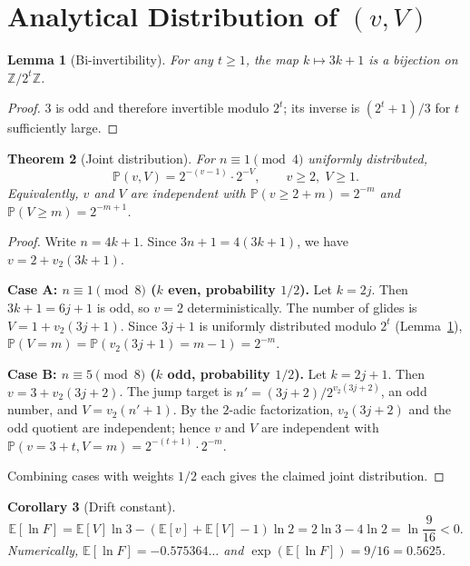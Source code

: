 \documentclass[12pt,a4paper]{article}
\newtheorem{theorem}{Theorem}[section]
\newtheorem{lemma}[theorem]{Lemma}
\newtheorem{corollary}[theorem]{Corollary}
\newcommand{\E}{\mathbb{E}}
\newcommand{\Prob}{\mathbb{P}}
\newcommand{\Z}{\mathbb{Z}}
\begin{document}
\section{Analytical Distribution of $(v,V)$}\label{sec:distribution}

\begin{lemma}[Bi-invertibility]\label{lem:bijection}
For any $t \ge 1$, the map $k \mapsto 3k+1$ is a bijection on $\Z/2^t\Z$.
\end{lemma}

\begin{proof}
$3$ is odd and therefore invertible modulo $2^t$; its inverse is $(2^t+1)/3$ for $t$ sufficiently large.
\end{proof}

\begin{theorem}[Joint distribution]\label{thm:distribution}
For $n \equiv 1 \pmod 4$ uniformly distributed,
\[
\Prob(v, V) = 2^{-(v-1)} \cdot 2^{-V}, \qquad v \ge 2,\; V \ge 1.
\]
Equivalently, $v$ and $V$ are independent with $\Prob(v \ge 2+m) = 2^{-m}$ and $\Prob(V \ge m) = 2^{-m+1}$.
\end{theorem}

\begin{proof}
Write $n = 4k+1$. Since $3n+1 = 4(3k+1)$, we have $v = 2 + v_2(3k+1)$.

\noindent\textbf{Case A: $n \equiv 1 \pmod 8$ ($k$ even, probability $1/2$).}
Let $k = 2j$. Then $3k+1 = 6j+1$ is odd, so $v = 2$ deterministically. The number of glides is $V = 1 + v_2(3j+1)$. Since $3j+1$ is uniformly distributed modulo $2^t$ (Lemma~\ref{lem:bijection}), $\Prob(V = m) = \Prob(v_2(3j+1) = m-1) = 2^{-m}$.

\noindent\textbf{Case B: $n \equiv 5 \pmod 8$ ($k$ odd, probability $1/2$).}
Let $k = 2j+1$. Then $v = 3 + v_2(3j+2)$. The jump target is $n' = (3j+2)/2^{v_2(3j+2)}$, an odd number, and $V = v_2(n'+1)$. By the $2$-adic factorization, $v_2(3j+2)$ and the odd quotient are independent; hence $v$ and $V$ are independent with $\Prob(v = 3+t, V = m) = 2^{-(t+1)} \cdot 2^{-m}$.

\noindent Combining cases with weights $1/2$ each gives the claimed joint distribution.
\end{proof}

\begin{corollary}[Drift constant]\label{cor:drift}
\[
\E[\ln F] = \E[V]\ln 3 - (\E[v] + \E[V] - 1)\ln 2 = 2\ln 3 - 4\ln 2 = \ln\frac{9}{16} < 0.
\]
Numerically, $\E[\ln F] = -0.575364\ldots$ and $\exp(\E[\ln F]) = 9/16 = 0.5625$.
\end{corollary}
\end{document}
